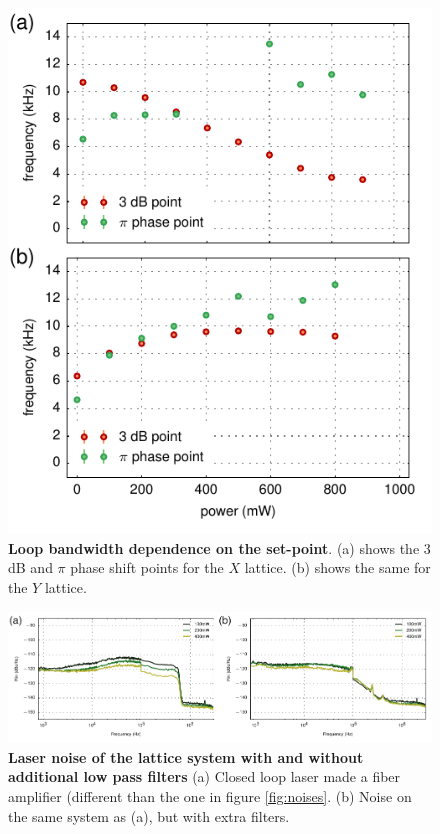 \documentclass[twocolumn,aps,pra,showpacs,preprintnumbers,bibnotes]{revtex4-1}
\begin{document}
\begin{figure}
  \begin{center}
    \includegraphics{fig/low_power_bandwidths.pdf}
    \caption{\textbf{Loop bandwidth dependence on the set-point}. (a) shows the $3$ dB and $\pi$ phase shift points for the $X$ lattice. (b) shows the same for the $Y$ lattice.}\label{fig:bandwidth}
  \end{center}
\end{figure}

\begin{figure}
  \begin{center}
    \includegraphics{fig/low_pass_filters.pdf}
    \caption{\textbf{Laser noise of the lattice system with and without additional low pass filters} (a) Closed loop laser made a fiber amplifier (different than the one in figure \ref{fig:noises}. (b) Noise on the same system as (a), but with extra filters.}\label{fig:low_pass_noises}
  \end{center}
\end{figure}
\end{document}
